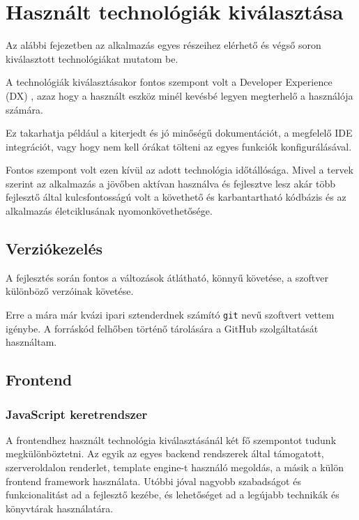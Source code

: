 \chapter{Használt technológiák kiválasztása}

Az alábbi fejezetben az alkalmazás egyes részeihez elérhető és végső soron kiválasztott technológiákat mutatom be.

A technológiák kiválasztásakor fontos szempont volt a Developer Experience (DX) \cite{DX}, azaz hogy a használt eszköz minél kevésbé legyen megterhelő a használója számára.

Ez takarhatja például a kiterjedt és jó minőségű dokumentációt, a megfelelő IDE integrációt, vagy hogy nem kell órákat tölteni az egyes funkciók konfigurálásával.

Fontos szempont volt ezen kívül az adott technológia időtállósága. Mivel a tervek szerint az alkalmazás a jövőben aktívan használva és fejlesztve
lesz akár több fejlesztő által kulcsfontosságú volt a követhető és karbantartható kódbázis és az alkalmazás életciklusának nyomonkövethetősége.

\section{Verziókezelés}

A fejlesztés során fontos a változások átlátható, könnyű követése, a szoftver különböző verzóinak követése.

Erre a mára már kvázi ipari sztenderdnek számító \lstinline|git| nevű szoftvert vettem igénybe. A forráskód felhőben
történő tárolására a GitHub szolgáltatását használtam.

\section{Frontend}
\subsection{JavaScript keretrendszer}
A frontendhez használt technológia kiválasztásánál két fő szempontot tudunk megkülönböztetni.
Az egyik az egyes backend rendszerek által támogatott, szerveroldalon renderlet, template engine-t használó megoldás, a másik a külön frontend framework használata.
Utóbbi jóval nagyobb szabadságot és funkcionalitást ad a fejlesztő kezébe, és lehetőséget ad a legújabb technikák és könyvtárak használatára.

